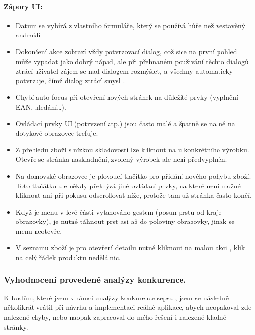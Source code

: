 \paragraph{Zápory UI:}
\begin{itemize}
	\item Datum se vybírá z vlastního formuláře, který se používá hůře než vestavěný androidí.
	\item Dokončení akce zobrazí vždy potvrzovací dialog, což sice na první pohled může vypadat jako dobrý nápad, ale při přehnaném použivání těchto dialogů ztrácí uživatel zájem se nad dialogem rozmýšlet, a všechny automaticky potvrzuje, čímž dialog ztrácí smysl \cite{nn-dialogs}.
	\item Chybí auto focus při otevření nových stránek na důležité prvky (vyplnění EAN, hledání…).
	\item Ovládací prvky UI (potrvzení atp.) jsou často malé a špatně se na ně na dotykové obrazovce trefuje.
	\item Z přehledu zboží s nízkou skladovostí lze kliknout na  u konkrétního výrobku. Otevře se stránka naskladnění, zvolený výrobek ale není předvyplněn.
	\item Na domovské obrazovce je plovoucí tlačítko pro přidání nového pohybu zboží. Toto tlačátko ale někdy překrývá jiné ovládací prvky, na které není možné kliknout ani při pokusu odscrollovat níže, protože tam už stránka často končí.
	\item Když je menu v levé části vytahováno gestem (posun prstu od kraje obrazovky), je nutné táhnout prst asi až do poloviny obrazovky, jinak se menu neotevře.
	\item V seznamu zboží je pro otevření detailu nutné kliknout na malou akci , klik na celý řádek produktu nedělá nic.
\end{itemize}


\subsubsection{Vyhodnocení provedené analýzy konkurence.}

K bodům, které jsem v rámci analýzy konkurence sepsal, jsem se následně několikrát vrátil při návrhu a implementaci reálné aplikace, abych neopakoval zde nalezené chyby, nebo naopak zapracoval do mého řešení i nalezené kladné stránky.
